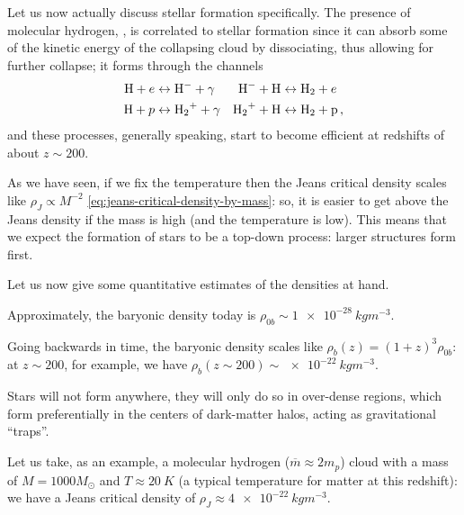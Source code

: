 \documentclass[main.tex]{subfiles}
\begin{document}


Let us now actually discuss stellar formation specifically.
The presence of molecular hydrogen, , is correlated to stellar formation since it can absorb some of the kinetic energy of the collapsing cloud by dissociating, thus allowing for further collapse; it forms through the channels
%
\begin{subequations}
\begin{align}
  \ce{H} + e &\leftrightarrow \ce{H-} + \gamma &
  \ce{H-} + \ce{H} &\leftrightarrow \ce{H2} + e  \\
   \ce{H}+ p &\leftrightarrow \ce{H2+} + \gamma  &
  \ce{H2+} + \ce{H} &\leftrightarrow \ce{H2} + \ce{p}
\,,
\end{align}
\end{subequations}
%
and these processes, generally speaking, start to become efficient at redshifts of about \(z \sim 200\). 

As we have seen, if we fix the temperature then the Jeans critical density scales like \(\rho _J \propto M^{-2}\) \eqref{eq:jeans-critical-density-by-mass}:
so, it is easier to get above the Jeans density if the mass is high (and the temperature is low). 
This means that we expect the formation of stars to be a top-down process: larger structures form first. 

Let us now give some quantitative estimates of the densities at hand.

Approximately, the baryonic density today is \(\rho_{0b} \sim \SI{1e-28}{kg m^{-3}}\). 

Going backwards in time, the baryonic density scales like \(\rho _b (z) = (1+z)^{3} \rho_{0b}\): at \(z \sim 200 \), for example, we have \(\rho_{b} (z \sim 200) \sim \SI{e-22}{kg m^{-3}}\). 

Stars will not form anywhere, they will only do so in over-dense regions, which form preferentially in the centers of dark-matter halos, acting as gravitational ``traps''. 

Let us take, as an example, a molecular hydrogen (\(\overline{m} \approx 2 m_p\)) cloud with a mass of \(M = 1000 M_{\odot}\) and \(T \approx \SI{20}{K}\) (a typical temperature for matter at this redshift): we have a Jeans critical density of \(\rho _J \approx \SI{4e-22}{kg m^{-3}}\). 
\end{document}
